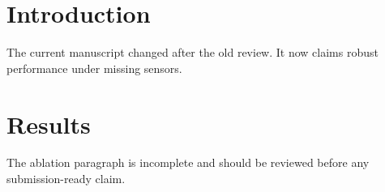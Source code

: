 \section{Introduction}
The current manuscript changed after the old review. It now claims robust performance under missing sensors.

\section{Results}
The ablation paragraph is incomplete and should be reviewed before any submission-ready claim.
